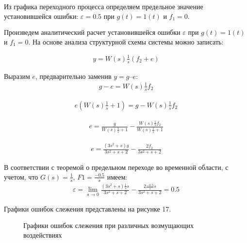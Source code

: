 \documentclass[a4paper, 11pt]{article}
\begin{document}
\par 
	Из графика переходного процесса определяем предельное значение установившейся ошибки: $\varepsilon = 0.5$ при $g(t)=1(t)$  и $f_1=0$.
\par 
Произведем аналитический расчет установившейся ошибки $\varepsilon$ при $g(t)=1(t)$  и $f_1=0$. На основе анализа структурной схемы системы можно записать:

\begin{align}
\displaystyle y=W(s)\frac{1}{s}(f_2+e)
\end{align} 

\par 
Выразим $e$, предварительно заменив $y = g – e$:
\begin{align}
\displaystyle g-e=W(s)\frac{1}{s}f_2
\end{align} 

\begin{align}
\displaystyle e(W(s)\frac{1}{s}+1)=g-W(s)\frac{1}{s}f_2
\end{align}

\begin{align}
e=\displaystyle\frac{g}{W(s)\frac{1}{s}+1}-\frac{W(s)\frac{1}{s}f_2}{W(s)\frac{1}{s}+1}
\end{align}

\begin{align}
e=\displaystyle\frac{(3s^2+s)g}{3s^2+s+2}-\frac{2f_2}{3s^2+s+2}
\end{align}

\par 
	В соответствии с теоремой о предельном переходе во временной области, с учетом, что $\displaystyle G(s) = \frac{1}{s}$, $\displaystyle F1= \frac{-0.5}{s}$ имеем:
\begin{align}
\varepsilon=\lim_{s\to 0}\displaystyle\frac{(3s^2+s)\frac{1}{s}s}{3s^2+s+2}-\frac{2\frac{-0.5}{s}s}{3s^2+s+2}=0.5
\end{align}


Графики ошибок слежения представлены на рисунке 17.

\newpage
\begin{figure}[h!]
\centering
{}
\caption{Графики ошибок слежения при различных возмущающих воздействиях}
\end{figure}
\end{document}
